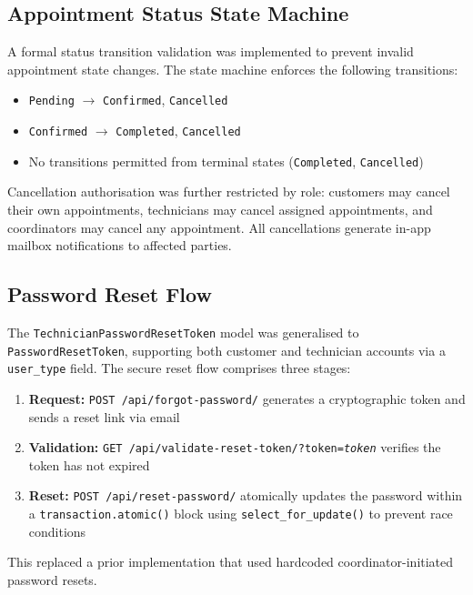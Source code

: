 \documentclass[conference]{IEEEtran}
\begin{document}
\subsection{Appointment Status State Machine}

A formal status transition validation was implemented to prevent invalid appointment state changes. The state machine enforces the following transitions:

\begin{itemize}
    \item \texttt{Pending} $\rightarrow$ \texttt{Confirmed}, \texttt{Cancelled}
    \item \texttt{Confirmed} $\rightarrow$ \texttt{Completed}, \texttt{Cancelled}
    \item No transitions permitted from terminal states (\texttt{Completed}, \texttt{Cancelled})
\end{itemize}

Cancellation authorisation was further restricted by role: customers may cancel their own appointments, technicians may cancel assigned appointments, and coordinators may cancel any appointment. All cancellations generate in-app mailbox notifications to affected parties.

\subsection{Password Reset Flow}

The \texttt{Technician\-Password\-Reset\-Token} model was generalised to \texttt{PasswordResetToken}, supporting both customer and technician accounts via a \texttt{user\_type} field. The secure reset flow comprises three stages:

\begin{enumerate}
    \item \textbf{Request:} \texttt{POST /api/forgot-password/} generates a cryptographic token and sends a reset link via email
    \item \textbf{Validation:} \texttt{GET /api/validate-reset-\allowbreak token/?\allowbreak token=\textit{token}} verifies the token has not expired
    \item \textbf{Reset:} \texttt{POST /api/reset-password/} atomically updates the password within a \texttt{transaction.\allowbreak atomic()} block using \texttt{select\_for\_\allowbreak update()} to prevent race conditions
\end{enumerate}

This replaced a prior implementation that used hardcoded coordinator-initiated password resets.
\end{document}
